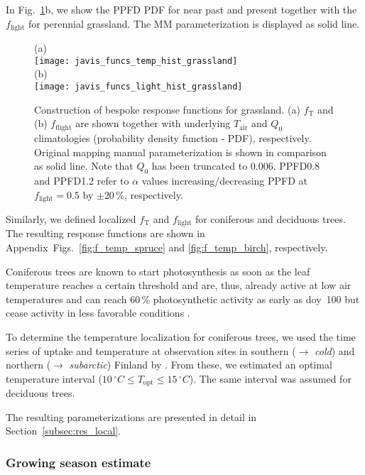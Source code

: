 \documentclass[bg, manuscript]{copernicus}
\begin{document}
In Fig.~\ref{fig:f_temp_grassland}b, we show the PPFD PDF for near past and present together with the $f_\mathrm{light}$ for perennial grassland. The MM parameterization is displayed as solid line. 

\begin{figure}[t]
  \centering
  (a)\\
  \texttt{[image: javis\_funcs\_temp\_hist\_grassland]}\\
  (b)\\
  \texttt{[image: javis\_funcs\_light\_hist\_grassland]}
\caption{Construction of bespoke response functions for grassland. (a) $f_\mathrm{T}$ and (b) $f_\mathrm{flight}$ are shown together with underlying $T_\mathrm{air}$ and $Q_0$ climatologies (probability density function - PDF), respectively. Original mapping manual parameterization is shown in comparison as solid line. Note that $Q_0$ has been truncated to $0.006$. PPFD0.8 and PPFD1.2 refer to $\alpha$ values increasing/decreasing PPFD at $f_\mathrm{light}=0.5$ by $\pm 20\,\%$, respectively.}
\label{fig:f_temp_grassland}
\end{figure}

Similarly, we defined localized $f_\mathrm{T}$ and $f_\mathrm{light}$ for coniferous and deciduous trees. The resulting response functions are shown in Appendix~Figs.~\ref{fig:f_temp_spruce} and \ref{fig:f_temp_birch}, respectively.

Coniferous trees are known to start photosynthesis as soon as the leaf temperature reaches a certain threshold \citep{TB:Kolari2007} and are, thus, already active at low air temperatures and can reach $60\,\unit{\%}$ photosynthetic activity as early as \unit{doy}~100 but cease activity in less favorable conditions \citep{TB:Kolari2007, TP:Wallin2013}. 

To determine the temperature localization for coniferous trees, we used the time series of  uptake and temperature at observation sites in southern ($\rightarrow$ \emph{cold}) and northern ($\rightarrow$ \emph{subarctic}) Finland by \citet{TB:Kolari2007}. From these, we estimated an optimal temperature interval ($10\,\unit{^\circ C}\le T_\mathrm{opt} \le 15\,\unit{^\circ C}$). The same interval was assumed for deciduous trees. 

The resulting parameterizations are presented in detail in Section~\ref{subsec:res_local}.

\subsubsection{Growing season estimate}
\label{subsec:gs_est}
\end{document}
